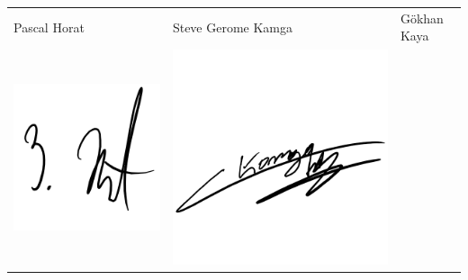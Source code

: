 \begin{tabular}{p{4cm}p{5cm}p{5.5cm}}
Pascal Horat & Steve Gerome Kamga & Gökhan Kaya\\
\includegraphics[scale=0.6]{img/unterschriftPascal}&
\includegraphics[scale=0.6]{img/unterschriftGerome}&

\end{tabular}
